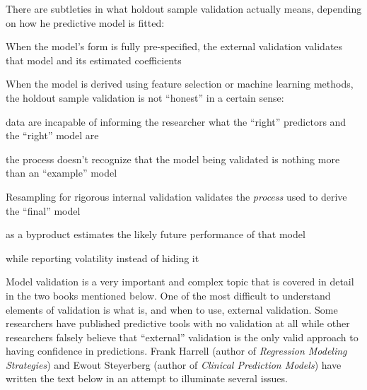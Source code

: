 There are subtleties in what holdout sample validation actually means,
depending on how he predictive model is fitted:
\bi
\item When the model's form is fully pre-specified, the external
  validation validates that model and its estimated coefficients
\item When the model is derived using feature selection or machine
  learning methods, the holdout sample validation is not ``honest'' in
  a certain sense:
  \bi
  \item data are incapable of informing the researcher what the
    ``right'' predictors and the ``right'' model are
  \item the process doesn't recognize that the model being validated
    is nothing more than an ``example'' model
  \ei
\item Resampling for rigorous internal validation validates the\ipacue
  \emph{process} used to derive the ``final'' model
  \bi
  \item as a byproduct estimates the likely future performance of that model
  \item while reporting volatility instead of hiding it
  \ei
\ei

Model validation is a very important and complex topic that is covered
in detail in the two books mentioned below.  One of the most
difficult to understand elements of validation is what is, and when to
use, external validation.  Some researchers have published predictive
tools with no validation at all while other researchers falsely
believe that ``external'' validation is the only valid approach to
having confidence in predictions.  Frank Harrell (author of
\emph{Regression Modeling Strategies}) and Ewout Steyerberg
(author of \emph{Clinical Prediction Models})
have written the text below in an attempt to illuminate several issues.

